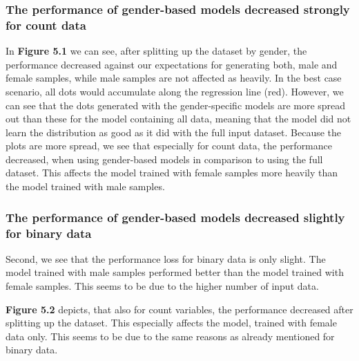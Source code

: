 \documentclass[11pt, a4paper, oneside]{book}
\begin{document}
\subsubsection{The performance of gender-based models decreased strongly for count data}
In \textbf{Figure 5.1} we can see, after splitting up the dataset by gender, the performance decreased against our expectations for generating both, male and female samples, while male samples are not affected as heavily. In the best case scenario, all dots would accumulate along the regression line (red). However, we can see that the dots generated with the gender-specific models are more spread out than these for the model containing all data, meaning that the model did not learn the distribution as good as it did with the full input dataset.
Because the plots are more spread, we see that especially for count data, the performance decreased, when using gender-based models in comparison to using the full dataset. This affects the model trained with female samples more heavily than the model trained with male samples.

\subsubsection{The performance of gender-based models decreased slightly for binary data}
Second, we see that the performance loss for binary data is only slight. The model trained with male samples performed better than the model trained with female samples. This seems to be due to the higher number of input data.


\textbf{Figure 5.2} depicts, that also for count variables, the performance decreased after splitting up the dataset. This especially affects the model, trained with female data only. This seems to be due to the same reasons as already mentioned for binary data.
\end{document}
